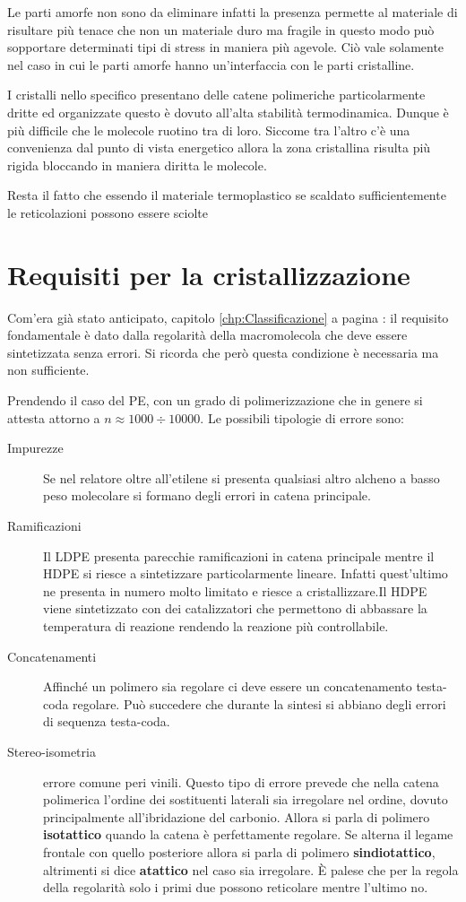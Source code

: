 Le parti amorfe non sono da eliminare infatti la presenza permette al materiale di risultare più tenace che non un materiale duro ma fragile in questo modo può sopportare determinati tipi di stress in maniera più agevole.
Ciò vale solamente nel caso in cui le parti amorfe hanno un'interfaccia con le parti cristalline.

I cristalli nello specifico presentano delle catene polimeriche particolarmente dritte ed organizzate questo è dovuto all'alta stabilità termodinamica. Dunque è più difficile che le molecole ruotino tra di loro. Siccome tra l'altro c'è una convenienza dal punto di vista energetico allora la zona cristallina risulta più rigida bloccando in maniera diritta le molecole.

Resta il fatto che essendo il materiale termoplastico se scaldato sufficientemente le reticolazioni possono essere sciolte 

\section{Requisiti per la cristallizzazione}
Com'era già stato anticipato, capitolo \ref{chp:Classificazione} a pagina \pageref{chp:Classificazione}: il requisito fondamentale è dato dalla regolarità della macromolecola che deve essere sintetizzata senza errori.
Si ricorda che però questa condizione è necessaria ma non sufficiente.

Prendendo il caso del \ac{PE}, con un grado di polimerizzazione che in genere si attesta attorno a $n \approx 1000 \div 10000$.
Le possibili tipologie di errore sono:
\begin{description}
\item[Impurezze] Se nel relatore oltre all'etilene si presenta qualsiasi altro alcheno a basso peso molecolare si formano degli errori in catena principale.
\item[Ramificazioni] Il \ac{LDPE} presenta parecchie ramificazioni in catena principale mentre il \ac{HDPE} si riesce a sintetizzare particolarmente lineare. Infatti quest'ultimo ne presenta in numero molto limitato e riesce a cristallizzare.Il \ac{HDPE} viene sintetizzato con dei catalizzatori che permettono di abbassare la temperatura di reazione rendendo la reazione più controllabile.
\item[Concatenamenti] Affinché un polimero sia regolare ci deve essere un concatenamento testa-coda regolare. Può succedere che durante la sintesi si abbiano degli errori di sequenza testa-coda.
\item[Stereo-isometria] errore comune peri vinili.  
Questo tipo di errore prevede che nella catena polimerica l'ordine dei sostituenti laterali sia irregolare nel ordine, dovuto principalmente all'ibridazione del carbonio. Allora si parla di polimero \textbf{isotattico} quando la catena è perfettamente regolare. Se alterna il legame frontale con quello posteriore allora si parla di polimero \textbf{sindiotattico}, altrimenti si dice \textbf{atattico} nel caso sia irregolare.
È palese che per la regola della regolarità solo i primi due possono reticolare mentre l'ultimo no.
\end{description}

